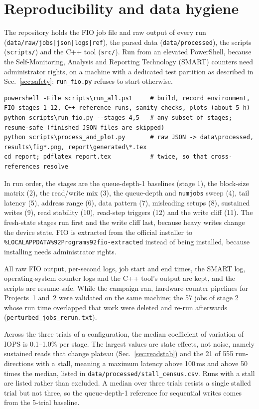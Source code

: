 \documentclass{article}
\begin{document}
\section{Reproducibility and data hygiene}\label{sec:repro}
The repository holds the FIO job file and raw output of every run (\texttt{data/raw/jobs|json|logs|ref}), the parsed data (\texttt{data/processed}), the scripts (\texttt{scripts/}) and the C++ tool (\texttt{src/}). Run from an elevated PowerShell, because the Self-Monitoring, Analysis and Reporting Technology (SMART) counters need administrator rights, on a machine with a dedicated test partition as described in Sec.~\ref{sec:safety}; \texttt{run\_fio.py} refuses to start otherwise.
\begin{lstlisting}
powershell -File scripts\run_all.ps1     # build, record environment, FIO stages 1-12, C++ reference runs, sanity checks, plots (about 5 h)
python scripts\run_fio.py --stages 4,5   # any subset of stages; resume-safe (finished JSON files are skipped)
python scripts\process_and_plot.py       # raw JSON -> data\processed, results\fig*.png, report\generated\*.tex
cd report; pdflatex report.tex           # twice, so that cross-references resolve
\end{lstlisting}
In run order, the stages are the queue-depth-1 baselines (stage 1), the block-size matrix (2), the read/write mix (3), the queue-depth and \texttt{numjobs} sweep (4), tail latency (5), address range (6), data pattern (7), misleading setups (8), sustained writes (9), read stability (10), read-step triggers (12) and the write cliff (11). The fresh-state stages run first and the write cliff last, because heavy writes change the device state. FIO is extracted from the official installer to \texttt{\%LOCALAPPDATA\%\char92Programs\char92fio-extracted} instead of being installed, because installing needs administrator rights.

All raw FIO output, per-second logs, job start and end times, the SMART log, operating-system counter logs and the C++ tool's output are kept, and the scripts are resume-safe. While the campaign ran, hardware-counter pipelines for Projects~1 and~2 were validated on the same machine; the 57 jobs of stage 2 whose run time overlapped that work were deleted and re-run afterwards (\texttt{perturbed\_jobs\_rerun.txt}).

Across the three trials of a configuration, the median coefficient of variation of IOPS is 0.1--1.0\% per stage. The largest values are state effects, not noise, namely sustained reads that change plateau (Sec.~\ref{sec:readstab}) and the 21 of 555 run-directions with a stall, meaning a maximum latency above 100\,ms and above 50 times the median, listed in \nolinkurl{data/processed/stall_census.csv}. Runs with a stall are listed rather than excluded. A median over three trials resists a single stalled trial but not three, so the queue-depth-1 reference for sequential writes comes from the 5-trial baseline.
\end{document}
